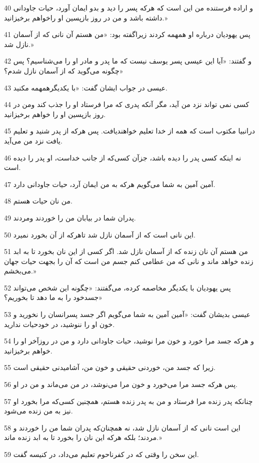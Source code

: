 \par 40 و اراده فرستنده من این است که هر‌که پسر را دید و بدو ایمان آورد، حیات جاودانی داشته باشد و من در روز بازپسین او راخواهم برخیزانید.»
\par 41 پس یهودیان درباره او همهمه کردند زیراگفته بود: «من هستم آن نانی که از آسمان نازل شد.»
\par 42 و گفتند: «آیا این عیسی پسر یوسف نیست که ما پدر و مادر او را می‌شناسیم؟ پس چگونه می‌گوید که از آسمان نازل شدم؟»
\par 43 عیسی در جواب ایشان گفت: «با یکدیگرهمهمه مکنید.
\par 44 کسی نمی تواند نزد من آید، مگر آنکه پدری که مرا فرستاد او را جذب کند ومن در روز بازپسین او را خواهم برخیزانید.
\par 45 درانبیا مکتوب است که همه از خدا تعلیم خواهندیافت. پس هر‌که از پدر شنید و تعلیم یافت نزد من می‌آید.
\par 46 نه اینکه کسی پدر را دیده باشد، جزآن کسی‌که از جانب خداست، او پدر را دیده است.
\par 47 آمین آمین به شما می‌گویم هر‌که به من ایمان آرد، حیات جاودانی دارد.
\par 48 من نان حیات هستم.
\par 49 پدران شما در بیابان من را خوردند ومردند.
\par 50 این نانی است که از آسمان نازل شد تاهر‌که از آن بخورد نمیرد.
\par 51 من هستم آن نان زنده که از آسمان نازل شد. اگر کسی از این نان بخورد تا به ابد زنده خواهد ماند و نانی که من عطامی کنم جسم من است که آن را بجهت حیات جهان می‌بخشم.»
\par 52 پس یهودیان با یکدیگر مخاصمه کرده، می‌گفتند: «چگونه این شخص می‌تواند جسدخود را به ما دهد تا بخوریم؟»
\par 53 عیسی بدیشان گفت: «آمین آمین به شما می‌گویم اگر جسد پسرانسان را نخورید و خون او را ننوشید، در خودحیات ندارید.
\par 54 و هر‌که جسد مرا خورد و خون مرا نوشید، حیات جاودانی دارد و من در روزآخر او را خواهم برخیزانید.
\par 55 زیرا که جسد من، خوردنی حقیقی و خون من، آشامیدنی حقیقی است.
\par 56 پس هر‌که جسد مرا می‌خورد و خون مرا می‌نوشد، در من می‌ماند و من در او.
\par 57 چنانکه پدر زنده مرا فرستاد و من به پدر زنده هستم، همچنین کسی‌که مرا بخورد او نیز به من زنده می‌شود.
\par 58 این است نانی که از آسمان نازل شد، نه همچنان‌که پدران شما من را خوردند و مردند؛ بلکه هر‌که این نان را بخورد تا به ابد زنده ماند.»
\par 59 این سخن را وقتی که در کفرناحوم تعلیم می‌داد، در کنیسه گفت.
